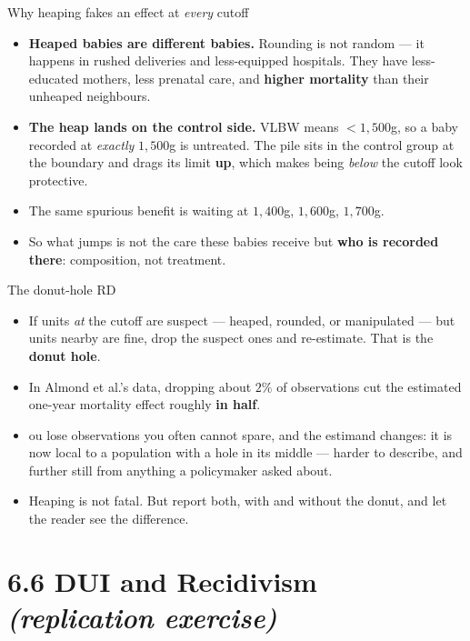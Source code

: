 \documentclass[
  11pt,
  ignorenonframetext,
  aspectratio=169,
]{beamer}
\providecommand{\tightlist}{%
  \setlength{\itemsep}{0pt}\setlength{\parskip}{0pt}}
\begin{document}
\begin{frame}{Why heaping fakes an effect at \emph{every} cutoff}
\protect{}\label{why-heaping-fakes-an-effect-at-every-cutoff}
\begin{itemize}
\tightlist
\item
  \textbf{Heaped babies are different babies.} Rounding is not random
  --- it happens in rushed deliveries and less-equipped hospitals. They
  have less-educated mothers, less prenatal care, and \textbf{higher
  mortality} than their unheaped neighbours.
\item
  \textbf{The heap lands on the control side.} VLBW means
  \(< 1{,}500\)g, so a baby recorded at \emph{exactly} \(1{,}500\)g is
  untreated. The pile sits in the control group at the boundary and
  drags its limit \textbf{up}, which makes being \emph{below} the cutoff
  look protective.
\item
  The same spurious benefit is waiting at \(1{,}400\)g, \(1{,}600\)g,
  \(1{,}700\)g.
\item
  So what jumps is not the care these babies receive but \textbf{who is
  recorded there}: composition, not treatment.
\end{itemize}
\end{frame}

\begin{frame}{The donut-hole RD}
\protect{}\label{the-donut-hole-rd}
\begin{itemize}
\tightlist
\item
  If units \emph{at} the cutoff are suspect --- heaped, rounded, or
  manipulated --- but units nearby are fine, drop the suspect ones and
  re-estimate. That is the \textbf{donut hole}.
\item
  In Almond et al.'s data, dropping about \textbf{\(2\%\)} of
  observations cut the estimated one-year mortality effect roughly
  \textbf{in half}.
\item
  ou lose observations you often cannot spare, and the estimand changes:
  it is now local to a population with a hole in its middle --- harder
  to describe, and further still from anything a policymaker asked
  about.
\item
  Heaping is not fatal. But report both, with and without the donut, and
  let the reader see the difference.
\end{itemize}
\end{frame}

\section{\texorpdfstring{6.6 DUI and Recidivism \emph{(replication
exercise)}}{6.6 DUI and Recidivism (replication exercise)}}\label{dui-and-recidivism-replication-exercise}
\end{document}
